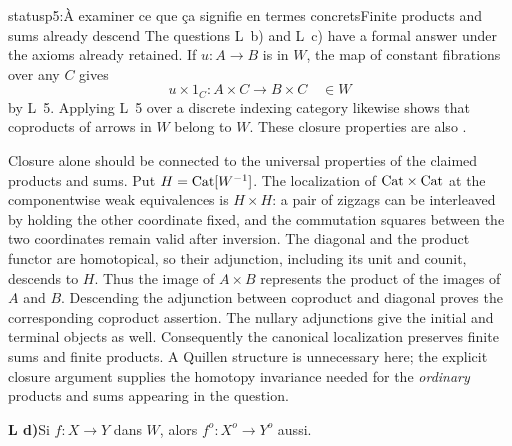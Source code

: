 \begin{dcomment}{status}{p5:À examiner ce que ça signifie en termes concrets}{Finite products and sums already descend}
The questions L~b) and L~c) have a formal answer under the axioms already retained. If $u:A\to B$ is in $W$, the map of constant fibrations over any $C$ gives
\[
 u\times1_C:A\times C\longrightarrow B\times C\quad\in W
\]
by L~5. Applying L~5 over a discrete indexing category likewise shows that coproducts of arrows in $W$ belong to $W$. These closure properties are also \citet[Propositions~1.1.5 and 1.1.7]{Cisinski2004Minimal}.

Closure alone should be connected to the universal properties of the claimed products and sums. Put $H=\mathrm{Cat}[W^{-1}]$. The localization of $\mathrm{Cat}\times\mathrm{Cat}$ at the componentwise weak equivalences is $H\times H$: a pair of zigzags can be interleaved by holding the other coordinate fixed, and the commutation squares between the two coordinates remain valid after inversion. The diagonal and the product functor are homotopical, so their adjunction, including its unit and counit, descends to $H$. Thus the image of $A\times B$ represents the product of the images of $A$ and $B$. Descending the adjunction between coproduct and diagonal proves the corresponding coproduct assertion. The nullary adjunctions give the initial and terminal objects as well. Consequently the canonical localization preserves finite sums and finite products. A Quillen structure is unnecessary here; the explicit closure argument supplies the homotopy invariance needed for the \emph{ordinary} products and sums appearing in the question.
\end{dcomment}


\textbf{L d)}\enspace Si $f : X \longrightarrow Y$ dans $W$, alors $f^o : X^o \longrightarrow Y^o$ aussi.

